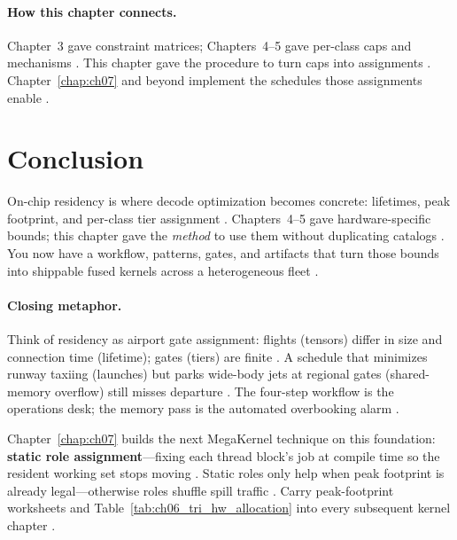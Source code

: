 \paragraph{How this chapter connects.}
Chapter~3 gave constraint matrices; Chapters~4--5 gave per-class caps and mechanisms \citep{chen2020compilerbasedhardw,nvidia2022hopper,amd2024xdna}.
This chapter gave the procedure to turn caps into assignments \citep{yirage2026,dlbook}.
Chapter~\ref{chap:ch07} and beyond implement the schedules those assignments enable \citep{taxbreak2026,patel2025llminference,mpk2025}.

\section{Conclusion}
\label{sec:ch06_conclusion}

On-chip residency is where decode optimization becomes concrete: lifetimes, peak footprint, and per-class tier assignment \citep{dlbook,chen2020compilerbasedhardw}.
Chapters~4--5 gave hardware-specific bounds; this chapter gave the \emph{method} to use them without duplicating catalogs \citep{nvidia2022hopper,amd2024xdna,yirage2026}.
You now have a workflow, patterns, gates, and artifacts that turn those bounds into shippable fused kernels across a heterogeneous fleet \citep{patel2025llminference,taxbreak2026,memoryfloor2026}.

\paragraph{Closing metaphor.}
Think of residency as airport gate assignment: flights (tensors) differ in size and connection time (lifetime); gates (tiers) are finite \citep{dlbook}.
A schedule that minimizes runway taxiing (launches) but parks wide-body jets at regional gates (shared-memory overflow) still misses departure \citep{taxbreak2026,yirage2026}.
The four-step workflow is the operations desk; the memory pass is the automated overbooking alarm \citep{wu2024mirage,chen2020compilerbasedhardw}.

Chapter~\ref{chap:ch07} builds the next MegaKernel technique on this foundation: \textbf{static role assignment}---fixing each thread block's job at compile time so the resident working set stops moving \citep{taxbreak2026,patel2025llminference}.
Static roles only help when peak footprint is already legal---otherwise roles shuffle spill traffic \citep{memoryfloor2026,yirage2026}.
Carry peak-footprint worksheets and Table~\ref{tab:ch06_tri_hw_allocation} into every subsequent kernel chapter \citep{yirage2026,memoryfloor2026}.

